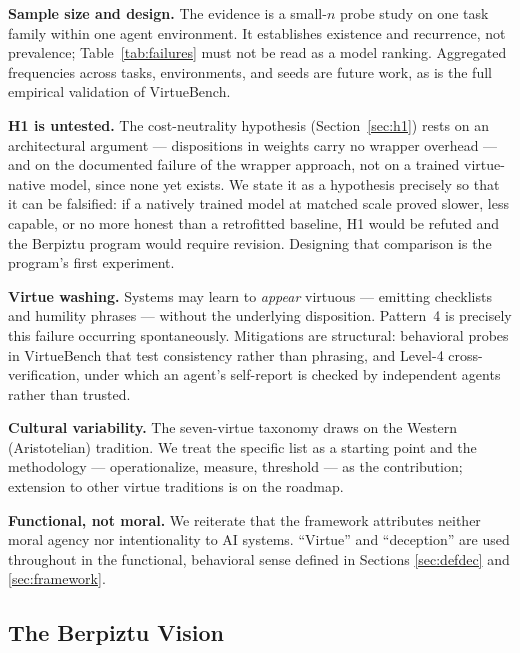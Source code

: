 \documentclass[11pt]{article}
\begin{document}
\textbf{Sample size and design.} The evidence is a small-$n$ probe study on one task family within one agent environment. It establishes existence and recurrence, not prevalence; Table~\ref{tab:failures} must not be read as a model ranking. Aggregated frequencies across tasks, environments, and seeds are future work, as is the full empirical validation of VirtueBench.

\textbf{H1 is untested.} The cost-neutrality hypothesis (Section~\ref{sec:h1}) rests on an architectural argument --- dispositions in weights carry no wrapper overhead --- and on the documented failure of the wrapper approach, not on a trained virtue-native model, since none yet exists. We state it as a hypothesis precisely so that it can be falsified: if a natively trained model at matched scale proved slower, less capable, or no more honest than a retrofitted baseline, H1 would be refuted and the Berpiztu program would require revision. Designing that comparison is the program's first experiment.

\textbf{Virtue washing.} Systems may learn to \emph{appear} virtuous --- emitting checklists and humility phrases --- without the underlying disposition. Pattern~4 is precisely this failure occurring spontaneously. Mitigations are structural: behavioral probes in VirtueBench that test consistency rather than phrasing, and Level-4 cross-verification, under which an agent's self-report is checked by independent agents rather than trusted.

\textbf{Cultural variability.} The seven-virtue taxonomy draws on the Western (Aristotelian) tradition. We treat the specific list as a starting point and the methodology --- operationalize, measure, threshold --- as the contribution; extension to other virtue traditions is on the roadmap.

\textbf{Functional, not moral.} We reiterate that the framework attributes neither moral agency nor intentionality to AI systems. ``Virtue'' and ``deception'' are used throughout in the functional, behavioral sense defined in Sections \ref{sec:defdec} and \ref{sec:framework}.

\subsection{The Berpiztu Vision}
\end{document}
